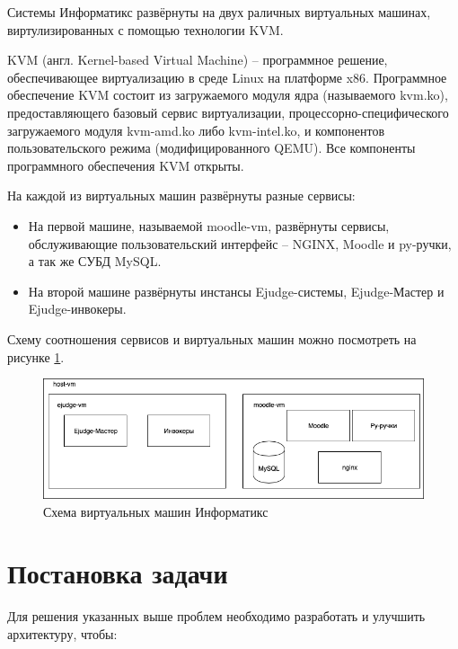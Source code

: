 Системы Информатикс развёрнуты на двух раличных виртуальных машинах,
виртулизированных с помощью технологии KVM.

KVM (англ. Kernel-based Virtual Machine) -- программное решение,
обеспечивающее виртуализацию в среде Linux на платформе x86.
Программное обеспечение KVM состоит из загружаемого модуля ядра (называемого kvm.ko),
предоставляющего базовый сервис виртуализации, процессорно-специфического загружаемого модуля kvm-amd.ko либо kvm-intel.ko, 
и компонентов пользовательского режима (модифицированного QEMU). 
Все компоненты программного обеспечения KVM открыты.

На каждой из виртуальных машин развёрнуты разные сервисы:

\begin{itemize}
    \item На первой машине, называемой moodle-vm, развёрнуты сервисы, обслуживающие пользовательский интерфейс -- NGINX, Moodle и py-ручки,
    а так же СУБД MySQL.
    \item На второй машине развёрнуты инстансы Ejudge-системы, Ejudge-Мастер и Ejudge-инвокеры.
\end{itemize}

Схему соотношения сервисов и виртуальных машин можно посмотреть на рисунке \ref{fig:old_vm}.

\begin{figure}
  \centering
  \includegraphics[width=\textwidth]{figures/old_vm.png}
  \caption{Схема виртуальных машин Информатикс}
  \label{fig:old_vm}
\end{figure}

\section{Постановка задачи}

Для решения указанных выше проблем необходимо разработать и улучшить архитектуру, чтобы:

